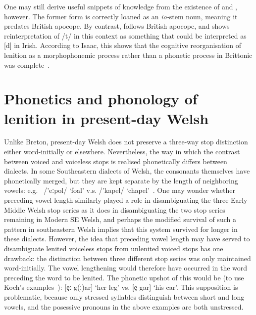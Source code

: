 One may still derive useful snippets of knowledge from the existence of  and , however. The former form is correctly loaned as an \textit{io-}stem noun, meaning it predates British apocope. By contrast,  follows British apocope, and shows reinterpretation of /t/ in this context as something that could be interpreted as [d] in Irish. According to Isaac, this shows that the cognitive reorganisation of lenition as a morphophonemic process rather than a phonetic process in Brittonic was complete~\autocite[73]{isaac_chronology_2004}. 

\section{Phonetics and phonology of lenition in present-day Welsh} 
Unlike Breton, present-day Welsh does not preserve a three-way stop distinction either word-initially or elsewhere. Nevertheless, the way in which the contrast between voiced and voiceless stops is realised phonetically differs between dialects. In some Southeastern dialects of Welsh, the consonants themselves have phonetically merged, but they are kept separate by the length of neighboring vowels: e.g.\  /'eːpol/ `foal' v.s.  /'kapel/ `chapel'~\parencite[85]{awbery_phonotactic_1984}. One may wonder whether preceding vowel length similarly played a role in disambiguating the three Early Middle Welsh stop series as it does in disambiguating the two stop series remaining in Modern SE Welsh, and perhaps the modified survival of such a pattern in southeastern Welsh implies that this system survived for longer in these dialects. However, the idea that preceding vowel length may have served to disambiguate lenited voiceless stops from unlenited voiced stops has one drawback: the distinction between three different stop series was only maintained word-initially. The vowel lengthening would therefore have occurred in the word preceding the word to be lenited. The phonetic upshot of this would be (to use Koch's examples~\autocite*[\S 26]{koch_*cothairche_1990}): [\c{e}ː g(ː)ar] `her leg' vs. [\c{e} gar] `his car'. This supposition is problematic, because only stressed syllables distinguish between short and long vowels, and the posessive pronouns in the above examples are both unstressed. 
 

